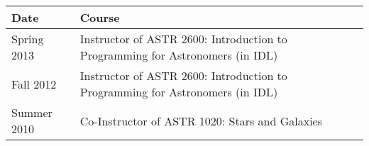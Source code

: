 \begin{minipage}{\textwidth}
\begin{tabular}{ll}
     Date         & Course \\
     \hline
     Spring 2013  &   Instructor of ASTR 2600: Introduction to Programming for Astronomers (in IDL) \\
     Fall 2012    &   Instructor of ASTR 2600: Introduction to Programming for Astronomers (in IDL) \\
     Summer 2010  &   Co-Instructor of ASTR 1020: Stars and Galaxies \\
     \hline
\end{tabular}

\end{minipage}
\vspace{4mm}
